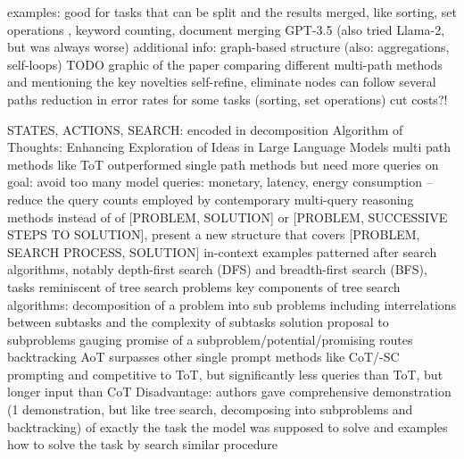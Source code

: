 \documentclass{article}
\begin{document}
examples: good for tasks that can be split and the results merged, like sorting, set operations , keyword counting, document merging
GPT-3.5 (also tried Llama-2, but was always worse)
additional info:
graph-based structure (also: aggregations, self-loops)
TODO graphic of the paper comparing different multi-path methods and mentioning the key novelties
self-refine, eliminate nodes
can follow several paths
reduction in error rates for some tasks (sorting, set operations)
cut costs?!




STATES, ACTIONS, SEARCH: encoded in decomposition
\cite{sel_algorithm_2023} Algorithm of Thoughts: Enhancing Exploration of Ideas in Large Language Models
multi path methods like ToT outperformed single path methods but need more queries
on goal: avoid too many model queries: monetary, latency, energy consumption --reduce the query counts employed by contemporary multi-query reasoning methods
instead of of [PROBLEM, SOLUTION] or [PROBLEM, SUCCESSIVE STEPS TO SOLUTION], present a new structure that covers [PROBLEM, SEARCH PROCESS, SOLUTION]
in-context examples patterned after search algorithms, notably depth-first search (DFS) and breadth-first search (BFS), tasks reminiscent of tree search problems
key components of tree search algorithms:
decomposition of a problem into sub problems including interrelations between subtasks and the complexity of subtasks
solution proposal to subproblems
gauging promise of a subproblem/potential/promising routes
backtracking
AoT surpasses other single prompt methods like  CoT/-SC prompting and competitive to ToT, but significantly less queries than ToT, but longer input than CoT
Disadvantage: authors gave comprehensive demonstration (1 demonstration, but like tree search, decomposing into subproblems and backtracking) of exactly the task the model was supposed to solve and examples how to solve the task by search similar procedure
\end{document}
